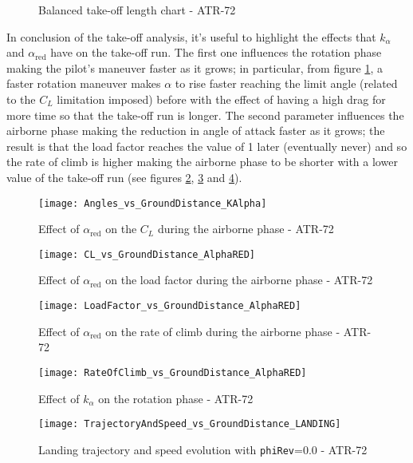 %
\begin{figure}[H]
\centering

\caption{Balanced take-off length chart - ATR-72}
\end{figure}
%
\noindent
In conclusion of the take-off analysis, it's useful to highlight the effects that $k_{\alpha}$ and $\alpha_{\text{red}}$ have on the take-off run. The first one influences the rotation phase making the pilot's maneuver faster as it grows; in particular, from figure \ref{fig:kAlphaEffects}, a faster rotation maneuver makes $\alpha$ to rise faster reaching the limit angle (related to the $C_L$ limitation imposed) before with the effect of having a high drag for more time so that the take-off run is longer. The second parameter influences the airborne phase making the reduction in angle of attack faster as it grows; the result is that the load factor reaches the value of 1 later (eventually never) and so the rate of climb is higher making the airborne phase to be shorter with a lower value of the take-off run (see figures \ref{fig:CLAlphaRED}, \ref{fig:LoadFactorAlphaRED} and \ref{fig:RateOfClimbAlphaRED}).
%
\begin{figure}[!b]
\centering
\texttt{[image: Angles\_vs\_GroundDistance\_KAlpha]}
\caption{Effect of $\alpha_{\text{red}}$ on the $C_L$ during the airborne phase - ATR-72}
\label{fig:kAlphaEffects}
\end{figure}
%
\begin{figure}[H]
\centering
\texttt{[image: CL\_vs\_GroundDistance\_AlphaRED]}
\caption{Effect of $\alpha_{\text{red}}$ on the load factor during the airborne phase - ATR-72}
\label{fig:CLAlphaRED}
\end{figure}
%
\begin{figure}[H]
\centering
\texttt{[image: LoadFactor\_vs\_GroundDistance\_AlphaRED]}
\caption{Effect of $\alpha_{\text{red}}$ on the rate of climb during the airborne phase - ATR-72}
\label{fig:LoadFactorAlphaRED}
\end{figure}
%
\begin{figure}[H]
\centering
\texttt{[image: RateOfClimb\_vs\_GroundDistance\_AlphaRED]}
\caption{Effect of $k_{\alpha}$ on the rotation phase - ATR-72}
\label{fig:RateOfClimbAlphaRED}
\end{figure}
%
%
\begin{figure}[!t]
\centering
\texttt{[image: TrajectoryAndSpeed\_vs\_GroundDistance\_LANDING]}
\caption{Landing trajectory and speed evolution with \lstinline[language=Java]!phiRev!=0.0 - ATR-72}
\label{fig:Landing1}
\end{figure}
